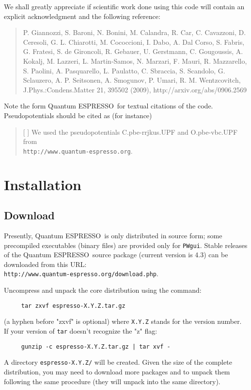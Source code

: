 \documentclass[12pt,a4paper]{article}
\def\version{4.3}
\def\qe{{\sc Quantum ESPRESSO}}
\begin{document}
We shall greatly appreciate if scientific work done using this code will 
contain an explicit acknowledgment and the following reference:
\begin{quote}
P. Giannozzi, S. Baroni, N. Bonini, M. Calandra, R. Car, C. Cavazzoni,
D. Ceresoli, G. L. Chiarotti, M. Cococcioni, I. Dabo, A. Dal Corso,
S. Fabris, G. Fratesi, S. de Gironcoli, R. Gebauer, U. Gerstmann,
C. Gougoussis, A. Kokalj, M. Lazzeri, L. Martin-Samos, N. Marzari,
F. Mauri, R. Mazzarello, S. Paolini, A. Pasquarello, L. Paulatto,
C. Sbraccia, S. Scandolo, G. Sclauzero, A. P. Seitsonen, A. Smogunov,
P. Umari, R. M. Wentzcovitch, J.Phys.:Condens.Matter 21, 395502 (2009),
http://arxiv.org/abs/0906.2569
\end{quote}
Note the form \qe\ for textual citations of the code.
Pseudopotentials should be cited as (for instance)
\begin{quote}
[ ] We used the pseudopotentials C.pbe-rrjkus.UPF
and O.pbe-vbc.UPF from\\
\texttt{http://www.quantum-espresso.org}.
\end{quote}
\section{Installation}

\subsection{Download}
 
Presently, \qe\ is only distributed in source form; 
some precompiled executables (binary files) are provided only for 
\texttt{PWgui}. 
Stable releases of the \qe\ source package (current version 
is \version) can be downloaded from this URL: \\
\texttt{http://www.quantum-espresso.org/download.php}.

Uncompress and unpack the core distribution using the command:
\begin{verbatim}
     tar zxvf espresso-X.Y.Z.tar.gz
\end{verbatim}
(a hyphen before "zxvf" is optional) where \texttt{X.Y.Z} stands for the
version number. If your version of \texttt{tar} 
doesn't recognize the "z" flag:
\begin{verbatim}
     gunzip -c espresso-X.Y.Z.tar.gz | tar xvf -
\end{verbatim}
A directory \texttt{espresso-X.Y.Z/} will be created. Given the size 
of the complete distribution, you may need to download more packages
and to unpack them following the same procedure (they will unpack into 
the same directory). 
\end{document}
